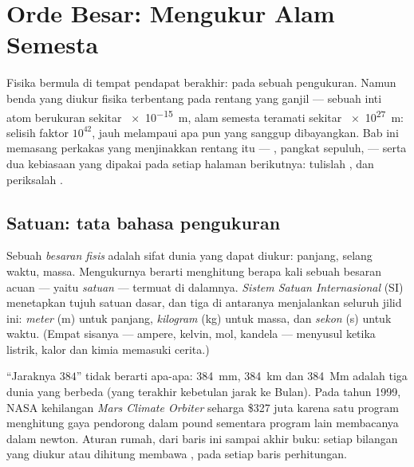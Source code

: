 \chapter{Orde Besar: Mengukur Alam Semesta}\label{ch:g10:orders-of-magnitude}

Fisika bermula di tempat pendapat berakhir: pada sebuah pengukuran.
Namun benda yang diukur fisika terbentang pada rentang yang ganjil ---
sebuah inti atom berukuran sekitar \qty{e-15}{m}, alam semesta teramati
sekitar \qty{e27}{m}: selisih faktor $10^{42}$, jauh melampaui apa pun
yang sanggup dibayangkan. Bab ini memasang perkakas yang menjinakkan
rentang itu --- , pangkat sepuluh,  --- serta dua
kebiasaan yang dipakai pada setiap halaman berikutnya: tulislah
, dan periksalah .

\section{Satuan: tata bahasa pengukuran}

\begin{definition}\label{def:g10:orders-of-magnitude:unit}
Sebuah \emph{besaran fisis} adalah sifat dunia yang
dapat diukur: panjang, selang waktu, massa. Mengukurnya berarti
menghitung berapa kali sebuah besaran acuan --- yaitu
\emph{satuan} --- termuat di dalamnya.
\emph{Sistem Satuan Internasional} (SI) menetapkan tujuh satuan dasar, dan tiga di antaranya
menjalankan seluruh jilid ini: \emph{meter} (\unit{m})
untuk panjang, \emph{kilogram} (\unit{kg}) untuk massa,
dan \emph{sekon} (\unit{s}) untuk waktu. (Empat sisanya
--- ampere, kelvin, mol, kandela --- menyusul ketika listrik, kalor dan
kimia memasuki cerita.)
\end{definition}

\begin{remark}\label{rem:g10:orders-of-magnitude:units}
``Jaraknya $384$'' tidak berarti apa-apa: \qty{384}{mm},
\qty{384}{km} dan \qty{384}{Mm} adalah tiga dunia yang berbeda (yang
terakhir kebetulan jarak ke Bulan). Pada tahun 1999, NASA kehilangan
\emph{Mars Climate Orbiter} seharga \$327 juta karena satu program
menghitung gaya pendorong dalam pound sementara program lain
membacanya dalam newton. Aturan rumah, dari baris ini sampai akhir
buku: setiap bilangan yang diukur atau dihitung membawa , pada
setiap baris perhitungan.
\end{remark}

